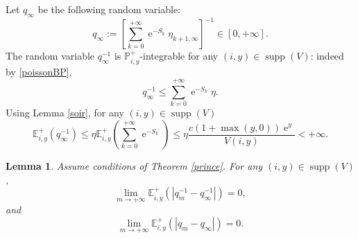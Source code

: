 \documentclass[12pt]{amsart}
\newtheorem{lemma}[theorem]{Lemma}
\theoremstyle{definition}
\numberwithin{equation}{section}
\newcommand*{\abs}[1]{\left\lvert#1\right\rvert}
\def\bb#1{\mathbb{#1}}
\def\leq{\leqslant}
\DeclareMathOperator{\e}{e}
\DeclareMathOperator{\supp}{supp}
\begin{document}
Let $q_{\infty}$ be the following random variable:
\begin{equation}
	\label{voyage}
	q_{\infty} := \left[ \sum_{k=0}^{+\infty} \e^{-S_k} \eta_{k+1,\infty} \right]^{-1} \in [0,+\infty].
\end{equation} 
The random variable $q_{\infty}^{-1}$ is $\bb P_{i,y}^+$-integrable for any $(i,y) \in \supp (V)$: indeed by \eqref{poissonBP},
\[
q_{\infty}^{-1} \leq \sum_{k=0}^{+\infty} \e^{-S_k} \eta.
\]
Using Lemma \ref{soir}, for any $(i,y) \in \supp (V)$
\begin{equation}
	\label{temple}
	\bb E_{i,y}^+ \left( q_{\infty}^{-1} \right) \leq \eta \bb E_{i,y}^+ \left( \sum_{k=0}^{+\infty} \e^{-S_k} \right) \leq \eta \frac{c \left( 1+\max(y,0) \right)\e^{y}}{V(i,y)} < +\infty.
\end{equation}

\begin{lemma}
Assume conditions of Theorem \ref{prince}.
For any $(i,y) \in \supp (V)$,
\begin{equation}
	\label{telescope001}
	\lim_{m\to+\infty} \bb E_{i,y}^+ \left( \abs{q_m^{-1} - q_{\infty}^{-1}} \right) = 0,
\end{equation}
and
\begin{equation}
	\label{telescope002}
	\lim_{m\to+\infty} \bb E_{i,y}^+ \left( \abs{q_m - q_{\infty}} \right) = 0.
\end{equation}
\end{lemma}
\end{document}
